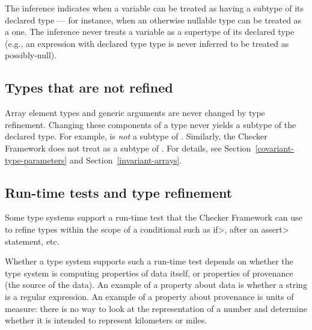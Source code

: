 The inference indicates when a variable can be treated as having a subtype
of its declared type --- for instance, when an otherwise nullable type can be
treated as a  one.  The inference never treats a variable as
a supertype of its declared type (e.g., an expression with declared type 
type is never inferred to be treated as possibly-null).



\subsection{Types that are not refined\label{type-refinement-types-that-are-not-refined}}

Array element types and generic arguments are never changed by type
refinement.  Changing these components of a type never yields a subtype of
the declared type.
For example,  is \emph{not} a
subtype of .  Similarly, the Checker Framework does not
treat  as a subtype of
.
For details, see Section~\ref{covariant-type-parameters} and
Section~\ref{invariant-arrays}.


\subsection{Run-time tests and type refinement\label{type-refinement-runtime-tests}}

Some type systems support a run-time test that the Checker Framework can
use to refine types within the scope of a conditional such as \<if>, after
an \<assert> statement, etc.

Whether a type system supports such a run-time test depends on whether the
type system is computing properties of data itself, or properties of
provenance (the source of the data).  An example of a property about data is
whether a string is a regular expression.  An example of a property about
provenance is units of measure:  there is no way to look at the
representation of a number and determine whether it is intended to
represent kilometers or miles.


